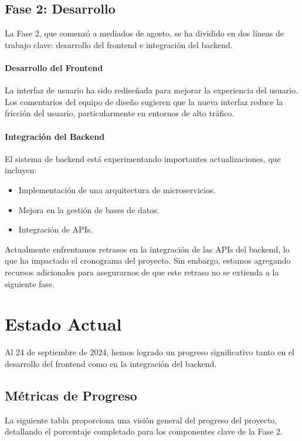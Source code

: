 \documentclass[12pt]{article}
\begin{document}
\subsection{Fase 2: Desarrollo}
La Fase 2, que comenzó a mediados de agosto, se ha dividido en dos líneas de trabajo clave: desarrollo del frontend e integración del backend.

\paragraph{Desarrollo del Frontend} La interfaz de usuario ha sido rediseñada para mejorar la experiencia del usuario. Los comentarios del equipo de diseño sugieren que la nueva interfaz reduce la fricción del usuario, particularmente en entornos de alto tráfico.

\paragraph{Integración del Backend} El sistema de backend está experimentando importantes actualizaciones, que incluyen:
\begin{itemize}
    \item Implementación de una arquitectura de microservicios.
    \item Mejora en la gestión de bases de datos.
    \item Integración de APIs.
\end{itemize}

Actualmente enfrentamos retrasos en la integración de las APIs del backend, lo que ha impactado el cronograma del proyecto. Sin embargo, estamos agregando recursos adicionales para asegurarnos de que este retraso no se extienda a la siguiente fase.

\section{Estado Actual}
Al 24 de septiembre de 2024, hemos logrado un progreso significativo tanto en el desarrollo del frontend como en la integración del backend.

\subsection{Métricas de Progreso}
La siguiente tabla proporciona una visión general del progreso del proyecto, detallando el porcentaje completado para los componentes clave de la Fase 2.
\end{document}
